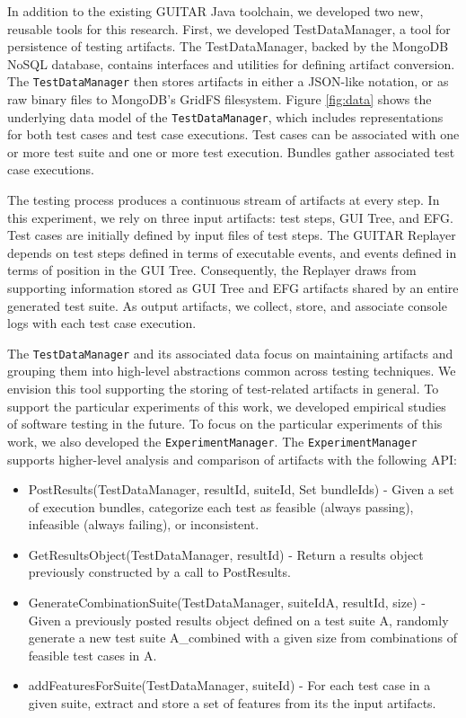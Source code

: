 In addition to the existing GUITAR Java toolchain, we developed two new, reusable tools for
this research. First, we developed TestDataManager, a tool for persistence of testing artifacts.
The TestDataManager, backed by the MongoDB NoSQL database, contains interfaces and utilities
for defining artifact conversion. The \texttt{TestDataManager} then stores artifacts in either a JSON-like
notation, or as raw binary files to MongoDB's GridFS filesystem. Figure \ref{fig:data} 
shows the underlying data model of the \texttt{TestDataManager}, which includes representations for both
test cases and test case executions. Test cases can be associated with one or more test suite and
one or more test execution. Bundles gather associated test case executions.

The testing process produces a continuous stream of artifacts at every step. In this experiment, we
rely on three input artifacts: test steps, GUI Tree, and EFG. Test cases are initially
defined by input files of test steps. The GUITAR Replayer depends on test steps defined in terms
of executable events, and events defined in terms of position in the GUI Tree. Consequently, the
Replayer draws from supporting information stored as GUI Tree and EFG artifacts shared by an
entire generated test suite. As output artifacts, we collect, store, and associate console
logs with each test case execution.

The \texttt{TestDataManager} and its associated data focus on maintaining artifacts and grouping them into
high-level abstractions common across testing techniques. We envision this tool supporting the storing
of test-related artifacts in general. To support the particular experiments of this work, we developed empirical
studies of software testing in the future. To focus on the particular
experiments of this work, we also developed the \texttt{ExperimentManager}. The \texttt{ExperimentManager}
supports higher-level analysis and comparison of artifacts with the following API:

\begin{itemize}
\item PostResults(TestDataManager, resultId, suiteId, Set bundleIds) - Given a set of execution bundles, categorize each test as feasible (always passing), infeasible (always failing), or inconsistent.
\item GetResultsObject(TestDataManager, resultId) - Return a results object previously constructed by a call to PostResults.
\item GenerateCombinationSuite(TestDataManager, suiteIdA, resultId, size) - Given a previously posted results object defined on a test suite A, randomly generate a new test suite {A\_combined} with a given size from combinations of feasible test cases in A.
\item addFeaturesForSuite(TestDataManager, suiteId) - For each test case in a given suite, extract and store a set of features from its the input artifacts.
\end{itemize}

